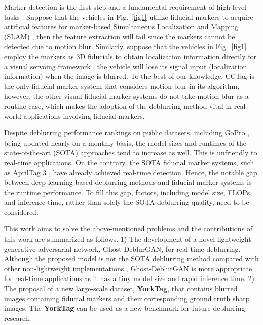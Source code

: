 \documentclass[letterpaper, 10 pt, conference]{ieeeconf}
\begin{document}
Marker detection is the first step and a fundamental requirement of high-level tasks \cite{munoz,munoz2019,yibo}. Suppose that the vehicles in Fig.~\ref{fig1} utilize fiducial markers to acquire artificial features for marker-based Simultaneous Localization and Mapping (SLAM) \cite{munoz,munoz2019}, then the feature extraction will fail since the markers cannot be detected due to motion blur. Similarly, suppose that the vehicles in Fig.~\ref{fig1} employ the markers as 3D fiducials to obtain localization information directly for a visual servoing framework \cite{yibo}, the vehicle will lose its signal input (localization information) when the image is blurred. To the best of our knowledge, CCTag \cite{cctag} is the only fiducial marker system that considers motion blur in its algorithm, however, the other visual fiducial marker systems \cite{olson,wang,aruco,ap3} do not take motion blur as a routine case, which makes the adoption of the deblurring method vital in real-world applications involving fiducial markers.

Despite deblurring performance rankings on public datasets, including GoPro \cite{nah}, being updated nearly on a monthly basis, the model sizes and runtimes of the state-of-the-art (SOTA) approaches \cite{chen2021hinet,zamir} tend to increase as well. This is unfriendly to real-time applications. On the contrary, the SOTA fiducial marker systems, such as AprilTag 3 \cite{ap3}, have already achieved real-time detection. Hence, the notable gap between deep-learning-based deblurring methods and fiducial marker systems is the runtime performance. To fill this gap, factors, including model size, FLOPs, and inference time, rather than solely the SOTA deblurring quality, need to be considered.

This work aims to solve the above-mentioned problems and the contributions of this work are summarized as follows. 1) The development of a novel lightweight generative adversarial network, Ghost-DeblurGAN, for real-time deblurring. Although the proposed model is not the SOTA deblurring method compared with other non-lightweight implementations \cite{chen2021hinet,zamir}, Ghost-DeblurGAN is more appropriate for real-time applications as it has a tiny model size and rapid inference time. 2) The proposal of a new large-scale dataset, \textbf{YorkTag}, that contains blurred images containing fiducial markers and their corresponding ground truth sharp images. The \textbf{YorkTag} can be used as a new benchmark for future deblurring research.
\end{document}
